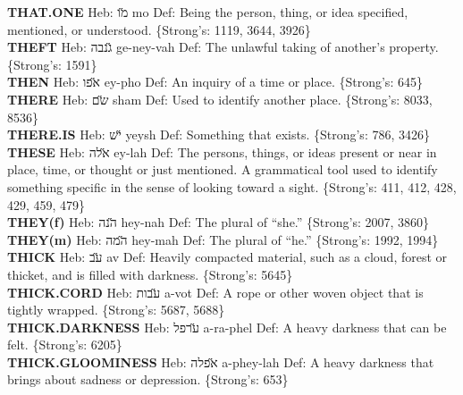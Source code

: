 {\textbf{THAT.ONE} Heb: {\large\H מו} mo Def: Being the person, thing, or idea specified, mentioned, or understood. \{Strong's: 1119, 3644, 3926\}\hfill{}\\

\textbf{THEFT} Heb: {\large\H גנבה} ge-ney-vah Def: The unlawful taking of another's property. \{Strong's: 1591\}\hfill{}\\

\textbf{THEN} Heb: {\large\H אפו} ey-pho Def: An inquiry of a time or place. \{Strong's: 645\}\hfill{}\\

\textbf{THERE} Heb: {\large\H שם} sham Def: Used to identify another place. \{Strong's: 8033, 8536\}\hfill{}\\

\textbf{THERE.IS} Heb: {\large\H יש} yeysh Def: Something that exists. \{Strong's: 786, 3426\}\hfill{}\\

\textbf{THESE} Heb: {\large\H אלה} ey-lah Def: The persons, things, or ideas present or near in place, time, or thought or just mentioned. A grammatical tool used to identify something specific in the sense of looking toward a sight. \{Strong's: 411, 412, 428, 429, 459, 479\}\hfill{}\\

\textbf{THEY(f)} Heb: {\large\H הנה} hey-nah Def: The plural of ``she.'' \{Strong's: 2007, 3860\}\hfill{}\\

\textbf{THEY(m)} Heb: {\large\H המה} hey-mah Def: The plural of ``he.'' \{Strong's: 1992, 1994\}\hfill{}\\

\textbf{THICK} Heb: {\large\H עב} av Def: Heavily compacted material, such as a cloud, forest or thicket, and is filled with darkness. \{Strong's: 5645\}\hfill{}\\

\textbf{THICK.CORD} Heb: {\large\H עבות} a-vot Def: A rope or other woven object that is tightly wrapped. \{Strong's: 5687, 5688\}\hfill{}\\

\textbf{THICK.DARKNESS} Heb: {\large\H ערפל} a-ra-phel Def: A heavy darkness that can be felt. \{Strong's: 6205\}\hfill{}\\

\textbf{THICK.GLOOMINESS} Heb: {\large\H אפלה} a-phey-lah Def: A heavy darkness that brings about sadness or depression. \{Strong's: 653\}\hfill{}\\

}
